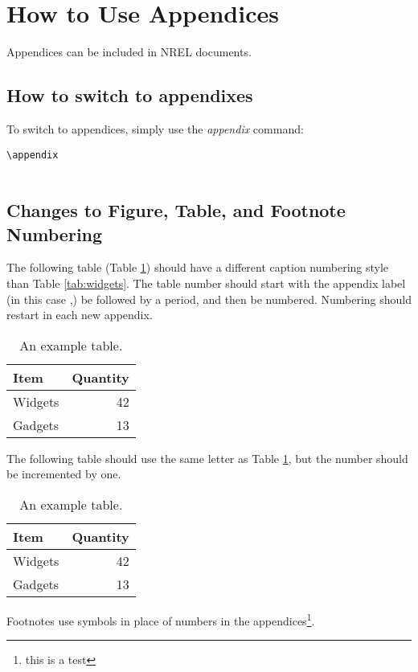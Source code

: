\section{How to Use Appendices}
Appendices can be included in NREL documents. 

\subsection{How to switch to appendixes}
To switch to appendices, simply use the \emph{appendix} command:

\begin{lstlisting}
\appendix


\end{lstlisting}

\subsection{Changes to Figure, Table, and Footnote Numbering}
The following table (Table \ref{tab:AppAWidgets}) should have a different caption numbering style than Table \ref{tab:widgets}. The table number should start with the appendix label (in this case \thechapter,) be followed by a period, and then be numbered. Numbering should restart in each new appendix.

\begin{table}[!h]
\centering
\caption{An example table.}\label{tab:AppAWidgets}
\begin{tabular}{lr}
Item & Quantity \\
\hline
Widgets & 42 \\
Gadgets & 13
\end{tabular}
\end{table}

The following table should use the same letter as Table \ref{tab:AppAWidgets}, but the number should be incremented by one.

\begin{table}[!h]
\centering
\caption{An example table.}\label{tab:AppAWidgetsTwo}
\begin{tabular}{lr}
Item & Quantity \\
\hline
Widgets & 42 \\
Gadgets & 13
\end{tabular}
\end{table}

Footnotes use symbols in place of numbers in the appendices\footnote{this is a test}.